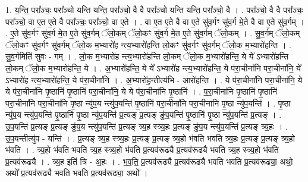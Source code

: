 \documentclass[17pt]{extarticle}
\begin{document}
1. य॒न्ति॒ परा᳚ञ्चः॒ परा᳚ञ्चो यन्ति यन्ति॒ परा᳚ञ्चो॒ वै वै परा᳚ञ्चो यन्ति यन्ति॒ परा᳚ञ्चो॒ वै । . परा᳚ञ्चो॒ वै वै परा᳚ञ्चः॒ परा᳚ञ्चो॒ वा ए॒त ए॒ते वै परा᳚ञ्चः॒ परा᳚ञ्चो॒ वा ए॒ते । . वा ए॒त ए॒ते वै वा ए॒ते सु॑व॒र्गꣳ सु॑व॒र्ग मे॒ते वै वा ए॒ते सु॑व॒र्गम् । . ए॒ते सु॑व॒र्गꣳ सु॑व॒र्ग मे॒त ए॒ते सु॑व॒र्गम् ॅलो॒कम् ॅलो॒कꣳ सु॑व॒र्ग मे॒त ए॒ते सु॑व॒र्गम् ॅलो॒कम् । . सु॒व॒र्गम् ॅलो॒कम् ॅलो॒कꣳ सु॑व॒र्गꣳ सु॑व॒र्गम् ॅलो॒क म॒भ्यारो॑ह न्त्य॒भ्यारो॑हन्ति लो॒कꣳ सु॑व॒र्गꣳ सु॑व॒र्गम् ॅलो॒क म॒भ्यारो॑हन्ति । . सु॒व॒र्गमिति॑ सुवः - गम् । . लो॒क म॒भ्यारो॑ह न्त्य॒भ्यारो॑हन्ति लो॒कम् ॅलो॒क म॒भ्यारो॑हन्ति॒ ये ये᳚ ऽभ्यारो॑हन्ति लो॒कम् ॅलो॒क म॒भ्यारो॑हन्ति॒ ये । . अ॒भ्यारो॑हन्ति॒ ये ये᳚ ऽभ्यारो॑ह न्त्य॒भ्यारो॑हन्ति॒ ये प॑रा॒चीना॑नि परा॒चीना॑नि॒ ये᳚ ऽभ्यारो॑ह न्त्य॒भ्यारो॑हन्ति॒ ये प॑रा॒चीना॑नि । . अ॒भ्यारो॑ह॒न्तीत्य॑भि - आरो॑हन्ति । . ये प॑रा॒चीना॑नि परा॒चीना॑नि॒ ये ये प॑रा॒चीना॑नि पृ॒ष्ठानि॑ पृ॒ष्ठानि॑ परा॒चीना॑नि॒ ये ये प॑रा॒चीना॑नि पृ॒ष्ठानि॑ । . प॒रा॒चीना॑नि पृ॒ष्ठानि॑ पृ॒ष्ठानि॑ परा॒चीना॑नि परा॒चीना॑नि पृ॒ष्ठा न्यु॑प॒य न्त्यु॑प॒यन्ति॑ पृ॒ष्ठानि॑ परा॒चीना॑नि परा॒चीना॑नि पृ॒ष्ठा न्यु॑प॒यन्ति॑ । . पृ॒ष्ठा न्यु॑प॒य न्त्यु॑प॒यन्ति॑ पृ॒ष्ठानि॑ पृ॒ष्ठा न्यु॑प॒यन्ति॑ प्र॒त्यङ् प्र॒त्यङ् ङु॑प॒यन्ति॑ पृ॒ष्ठानि॑ पृ॒ष्ठा न्यु॑प॒यन्ति॑ प्र॒त्यङ् । . उ॒प॒यन्ति॑ प्र॒त्यङ् प्र॒त्यङ् ङु॑प॒य न्त्यु॑प॒यन्ति॑ प्र॒त्यङ् त्र्य॒ह स्त्र्य॒हः प्र॒त्यङ् ङु॑प॒य न्त्यु॑प॒यन्ति॑ प्र॒त्यङ् त्र्य॒हः । . उ॒प॒यन्तीत्यु॑प - यन्ति॑ । . प्र॒त्यङ् त्र्य॒ह स्त्र्य॒हः प्र॒त्यङ् प्र॒त्यङ् त्र्य॒हो भ॑वति भवति त्र्य॒हः प्र॒त्यङ् प्र॒त्यङ् त्र्य॒हो भ॑वति । . त्र्य॒हो भ॑वति भवति त्र्य॒ह स्त्र्य॒हो भ॑वति प्र॒त्यव॑रूढ्यै प्र॒त्यव॑रूढ्यै भवति त्र्य॒ह स्त्र्य॒हो भ॑वति प्र॒त्यव॑रूढ्यै । . त्र्य॒ह इति॑ त्रि - अ॒हः । . भ॒व॒ति॒ प्र॒त्यव॑रूढ्यै प्र॒त्यव॑रूढ्यै भवति भवति प्र॒त्यव॑रूढ्या॒ अथो॒ अथो᳚ प्र॒त्यव॑रूढ्यै भवति भवति प्र॒त्यव॑रूढ्या॒ अथो᳚ । \newline
\end{document}
